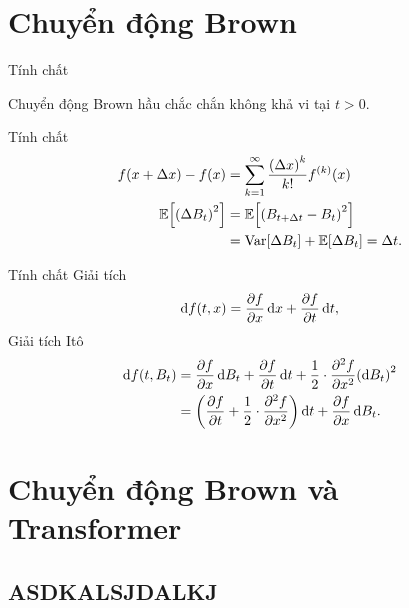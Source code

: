 \documentclass[tocsection,footlinesection,aspectratio=169,mathserif]{beamer}
\newcommand{\citef}[1]{\cite{#1}\ffcite{#1}}
\begin{document}
\section{Chuyển động Brown}
\begin{frame}[nosection]{Tính chất}
	\begin{prop}\label{prop:nowhere-diff-brown}
		Chuyển động Brown hầu chắc chắn không khả vi
		tại $t>0$\citef{S096:17}.
	\end{prop}
\end{frame}


\begin{frame}{Tính chất}
	\begin{align}
		f\left(x+\Delta x\right)-f\left(x\right)      & =\sum_{k=1}^{\infty}\frac{\left(\Delta x\right)^{k}}{k!}f^{\left(k\right)}\left(x\right) \\
		\Ex\left[\left(\Delta B_{t}\right)^{2}\right] & =\Ex\left[\left(B_{t+\Delta t}-B_{t}\right)^{2}\right]                                   \\
		                                              & =\Var\left[\Delta B_{t}\right]+\Ex\left[\Delta B_{t}\right]=\Delta t.
	\end{align}
\end{frame}

\begin{frame}{Tính chất}
	Giải tích
	\begin{align}
		\D f\left(t,x\right)=\frac{\partial f}{\partial x}\D x+\frac{\partial f}{\partial t}\D t,
	\end{align}
	Giải tích Itô
	\begin{align}
		\D f\left(t,B_{t}\right) & =\frac{\partial f}{\partial x}\D B_{t}+\frac{\partial f}{\partial t}\D t+\frac{1}{2}\cdot\frac{\partial^{2}f}{\partial x^{2}}\left(\D B_{t}\right)^{2} \nonumber \\
		                         & =\left(\frac{\partial f}{\partial t}+\frac{1}{2}\cdot\frac{\partial^{2}f}{\partial x^{2}}\right)\D t+\frac{\partial f}{\partial x}\D B_{t}.\label{eq:ito-diff}
	\end{align}
\end{frame}

	\section{Chuyển động Brown và Transformer}

\subsection{ASDKALSJDALKJ}
\end{document}
